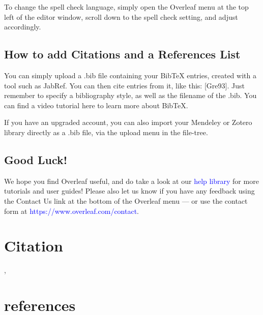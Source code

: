 \documentclass{article}
\begin{document}
    To change the spell check language, simply open the Overleaf menu at the top left of the editor window, scroll down to the spell check setting, and adjust accordingly.
    
    \subsection{How to add Citations and a References List}
    You can simply upload a .bib file containing your BibTeX entries, created with a tool such as JabRef.
    You can then cite entries from it, like this: [Gre93]. Just remember to specify a bibliography style, as
    well as the filename of the .bib. You can find a video tutorial here to learn more about BibTeX.
    
    If you have an upgraded account, you can also import your Mendeley or Zotero library directly as
    a .bib file, via the upload menu in the file-tree.
    
    \subsection{Good Luck!}
    We hope you find Overleaf useful, and do take a look at our \textcolor{blue}{help library} for more tutorials and user
    guides! Please also let us know if you have any feedback using the Contact Us link at the bottom of the Overleaf menu — or use the contact form at \textcolor{blue}{https://www.overleaf.com/contact}.
    
    \section{Citation}
    \cite{abrahamsson2017agile},
    \section{references}
    
    
 
\end{document}
